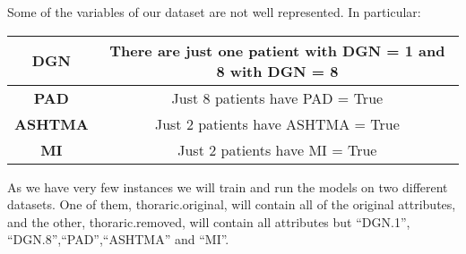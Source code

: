 Some of the variables of our dataset are not well represented. In particular:

\begin{center}
\begin{tabular}{|c|c|}
  \hline
  \textbf{DGN} & There are just one patient with DGN = 1 and 8 with DGN = 8 \\
  \hline
  \textbf{PAD} & Just 8 patients have PAD = True \\
  \hline
  \textbf{ASHTMA} & Just 2 patients have ASHTMA = True \\
  \hline
  \textbf{MI} & Just 2 patients have MI = True \\
  \hline
\end{tabular}
\end{center}

As we have very few instances we will train and run the models on two different datasets. One of them, thoraric.original, will contain all of the original attributes, and the other, thoraric.removed, will contain all attributes but  ``DGN.1'', ``DGN.8'',``PAD'',``ASHTMA'' and ``MI''.



%



